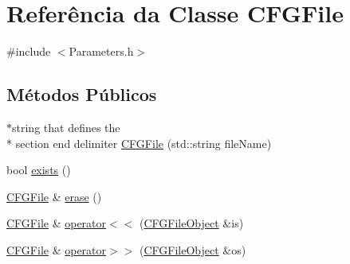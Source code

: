 \hypertarget{class_c_f_g_file}{\section{Referência da Classe C\-F\-G\-File}
\label{class_c_f_g_file}
}


{\ttfamily \#include $<$Parameters.\-h$>$}

\subsection*{Métodos Públicos}
\begin{DoxyCompactItemize}
\item 
$\ast$string that defines the \\*
section end delimiter \hyperlink{class_c_f_g_file_aa6bc079ab22f0ba59dc9e66cc411eb4e}{C\-F\-G\-File} (std\-::string file\-Name)
\item 
bool \hyperlink{class_c_f_g_file_a4511cba3770e85a6e57aab94a85eb636}{exists} ()
\item 
\hyperlink{class_c_f_g_file}{C\-F\-G\-File} \& \hyperlink{class_c_f_g_file_ab1ed4a730353e4cf6fc4d8ad046784e7}{erase} ()
\item 
\hyperlink{class_c_f_g_file}{C\-F\-G\-File} \& \hyperlink{class_c_f_g_file_a5c8e2b26555638d9f9aabf15a4b8a4eb}{operator$<$$<$} (\hyperlink{class_c_f_g_file_object}{C\-F\-G\-File\-Object} \&is)
\item 
\hyperlink{class_c_f_g_file}{C\-F\-G\-File} \& \hyperlink{class_c_f_g_file_a1280c628bd06d77f70ea1d758326d0fa}{operator$>$$>$} (\hyperlink{class_c_f_g_file_object}{C\-F\-G\-File\-Object} \&os)
\end{DoxyCompactItemize}
